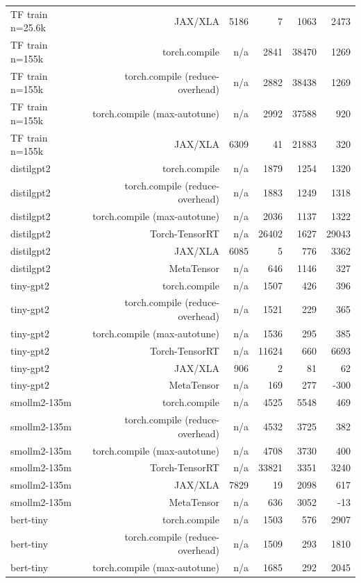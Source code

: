 \begin{tabular}{lrrrrr}
TF train n=25.6k & JAX/XLA & 5186 & 7 & 1063 & 2473 \\
TF train n=155k & torch.compile & n/a & 2841 & 38470 & 1269 \\
TF train n=155k & torch.compile (reduce-overhead) & n/a & 2882 & 38438 & 1269 \\
TF train n=155k & torch.compile (max-autotune) & n/a & 2992 & 37588 & 920 \\
TF train n=155k & JAX/XLA & 6309 & 41 & 21883 & 320 \\
distilgpt2 & torch.compile & n/a & 1879 & 1254 & 1320 \\
distilgpt2 & torch.compile (reduce-overhead) & n/a & 1883 & 1249 & 1318 \\
distilgpt2 & torch.compile (max-autotune) & n/a & 2036 & 1137 & 1322 \\
distilgpt2 & Torch-TensorRT & n/a & 26402 & 1627 & 29043 \\
distilgpt2 & JAX/XLA & 6085 & 5 & 776 & 3362 \\
distilgpt2 & MetaTensor & n/a & 646 & 1146 & 327 \\
tiny-gpt2 & torch.compile & n/a & 1507 & 426 & 396 \\
tiny-gpt2 & torch.compile (reduce-overhead) & n/a & 1521 & 229 & 365 \\
tiny-gpt2 & torch.compile (max-autotune) & n/a & 1536 & 295 & 385 \\
tiny-gpt2 & Torch-TensorRT & n/a & 11624 & 660 & 6693 \\
tiny-gpt2 & JAX/XLA & 906 & 2 & 81 & 62 \\
tiny-gpt2 & MetaTensor & n/a & 169 & 277 & -300 \\
smollm2-135m & torch.compile & n/a & 4525 & 5548 & 469 \\
smollm2-135m & torch.compile (reduce-overhead) & n/a & 4532 & 3725 & 382 \\
smollm2-135m & torch.compile (max-autotune) & n/a & 4708 & 3730 & 400 \\
smollm2-135m & Torch-TensorRT & n/a & 33821 & 3351 & 3240 \\
smollm2-135m & JAX/XLA & 7829 & 19 & 2098 & 617 \\
smollm2-135m & MetaTensor & n/a & 636 & 3052 & -13 \\
bert-tiny & torch.compile & n/a & 1503 & 576 & 2907 \\
bert-tiny & torch.compile (reduce-overhead) & n/a & 1509 & 293 & 1810 \\
bert-tiny & torch.compile (max-autotune) & n/a & 1685 & 292 & 2045 \\

\end{tabular}
